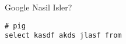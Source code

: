 \documentclass[12pt,fleqn]{article}\usepackage{../common}
\begin{document}
Google Nasil Isler? 

\begin{verbatim} 
# pig
select kasdf akds jlasf from
\end{verbatim}
\end{document}

